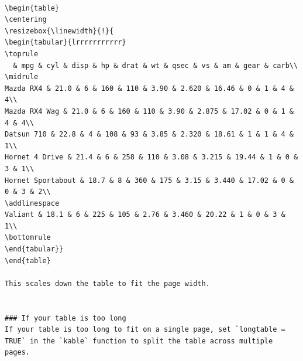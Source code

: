 \documentclass[a4paper, nobind]{templates/ociamthesis}
\begin{document}
\begin{verbatim}

\begin{table}
\centering
\resizebox{\linewidth}{!}{
\begin{tabular}{lrrrrrrrrrrr}
\toprule
  & mpg & cyl & disp & hp & drat & wt & qsec & vs & am & gear & carb\\
\midrule
Mazda RX4 & 21.0 & 6 & 160 & 110 & 3.90 & 2.620 & 16.46 & 0 & 1 & 4 & 4\\
Mazda RX4 Wag & 21.0 & 6 & 160 & 110 & 3.90 & 2.875 & 17.02 & 0 & 1 & 4 & 4\\
Datsun 710 & 22.8 & 4 & 108 & 93 & 3.85 & 2.320 & 18.61 & 1 & 1 & 4 & 1\\
Hornet 4 Drive & 21.4 & 6 & 258 & 110 & 3.08 & 3.215 & 19.44 & 1 & 0 & 3 & 1\\
Hornet Sportabout & 18.7 & 8 & 360 & 175 & 3.15 & 3.440 & 17.02 & 0 & 0 & 3 & 2\\
\addlinespace
Valiant & 18.1 & 6 & 225 & 105 & 2.76 & 3.460 & 20.22 & 1 & 0 & 3 & 1\\
\bottomrule
\end{tabular}}
\end{table}

This scales down the table to fit the page width.


### If your table is too long
If your table is too long to fit on a single page, set `longtable = TRUE` in the `kable` function to split the table across multiple pages.



\end{verbatim}
\end{document}
